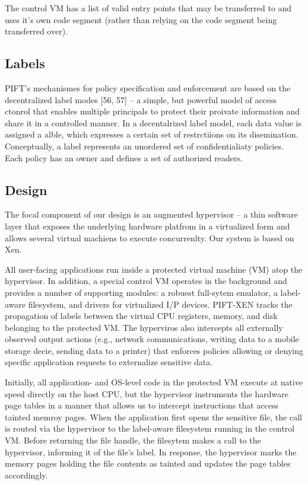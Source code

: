 The control VM has a list of valid entry points that may be transferred to and
uses it's own code segment (rather than relying on the code segment being
transferred over).



\subsection{Labels}
PIFT's mechanismes for policy specification and enforcement are based on the
decentralized label modes [56, 57] -- a simple, but powerful model of access
ctonrol that enables multiple principals to protect their proivate information
and share it in a controlled manner.  In a decentalrized label model, each data
value is assigned a alble, which expresses a certain set of restrctiions on its
disemination.  Conceptually, a label represents an unordered set of
confidentialiaty policies.  Each policy has an owner and defines a set of
authorized readers.  


\subsection{Design}
The focal component of our design is an augmented hypervisor -- a thin software
layer that exposes the underlying hardware platfrom in a virtualized form and
allows several virtual machiens to execute concurrenlty.  Our system is based
on Xen.

All user-facing applications run inside a protected virtual machine (VM) atop
the hypervisor.  In addition, a special control VM operates in the background
and provides a number of supporting modules: a robuest full-sytem emulator, a
label-aware filesystem, and drivers for virtualized I/P devices.  PIFT-XEN
tracks the propagation of labels between the virtual CPU registers, memory, and
disk belonging to the protected VM.  The hyperviros also intercepts all
externally observed output actions (e.g., network communications, writing
data to a mobile storage decie, sending  data to a printer) that enforces
policies allowing or denying specific application requests to externalize
sensitive data.

Initially, all application- and OS-level code in the protected VM execute at
native speed directly on the host CPU, but the hypervisor instruments the
hardware page tables in a manner that allows us to intercept instructions that
access tainted memroy pages.  When the application first opens the sensitive file,
the call is routed via the hypervisor to the label-aware filesystem running
in the control VM.  Before returning the file handle, the filesytem makes a
call to the hypervisor, informing it of the file's label.  In response, the
hypervisor marks the memory pages holding the file contents as tainted and
updates the page tables accordingly.

